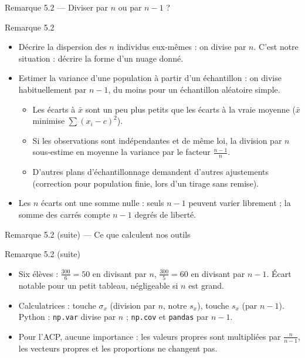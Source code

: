 \begin{frame}{Remarque 5.2 --- Diviser par $n$ ou par $n-1$ ?}
  \begin{Rem}{Remarque 5.2}
    \small
    \begin{itemize}
      \item Décrire la dispersion des $n$ individus eux-mêmes : on divise par
        $n$. C'est notre situation : décrire la forme d'un nuage donné.
      \item Estimer la variance d'une population à partir d'un échantillon :
        on divise habituellement par $n-1$, du moins pour un échantillon
        aléatoire simple.
        \begin{itemize}
          \item Les écarts à $\bar x$ sont un peu plus petits que les écarts
            à la vraie moyenne ($\bar x$ minimise $\sum(x_i-c)^2$).
          \item Si les observations sont indépendantes et de même loi, la
            division par $n$ sous-estime en moyenne la variance par le
            facteur $\frac{n-1}{n}$.
          \item D'autres plans d'échantillonnage demandent d'autres
            ajustements (correction pour population finie, lors d'un tirage
            sans remise).
        \end{itemize}
      \item Les $n$ écarts ont une somme nulle : seuls $n-1$ peuvent varier
        librement ; la somme des carrés compte $n-1$ degrés de liberté.
    \end{itemize}
  \end{Rem}
\end{frame}

\begin{frame}{Remarque 5.2 (suite) --- Ce que calculent nos outils}
  \begin{Rem}{Remarque 5.2 (suite)}
    \begin{itemize}
      \item Six élèves : $\frac{300}{6}=50$ en divisant par $n$,
        $\frac{300}{5}=60$ en divisant par $n-1$. Écart notable pour un petit
        tableau, négligeable si $n$ est grand.
      \item Calculatrices : touche $\sigma_x$ (division par $n$, notre $s_x$),
        touche $s_x$ (par $n-1$). Python : \texttt{np.var} divise par $n$ ;
        \texttt{np.cov} et \texttt{pandas} par $n-1$.
      \item Pour l'ACP, aucune importance : les valeurs propres sont
        multipliées par $\frac{n}{n-1}$, les vecteurs propres et les
        proportions ne changent pas.
    \end{itemize}
  \end{Rem}
\end{frame}

